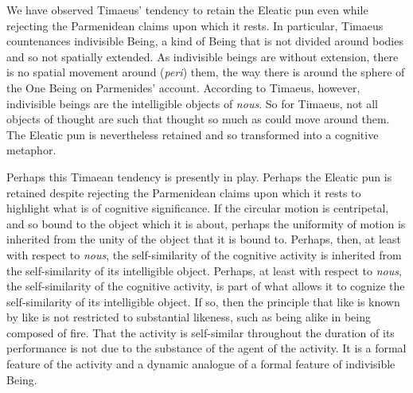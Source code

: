 We have observed Timaeus' tendency to retain the Eleatic pun even while rejecting the Parmenidean claims upon which it rests. In particular, Timaeus countenances indivisible Being, a kind of Being that is not divided around bodies and so not spatially extended. As indivisible beings are without extension, there is no spatial movement around (\emph{peri}) them, the way there is around the sphere of the One Being on Parmenides’ account. According to Timaeus, however, indivisible beings are the intelligible objects of \emph{nous}. So for Timaeus, not all objects of thought are such that thought so much as could move around them. The Eleatic pun is nevertheless retained and so transformed into a cognitive metaphor. 

Perhaps this Timaean tendency is presently in play. Perhaps the Eleatic pun is retained despite rejecting the Parmenidean claims upon which it rests to highlight what is of cognitive significance. If the circular motion is centripetal, and so bound to the object which it is about, perhaps the uniformity of motion is inherited from the unity of the object that it is bound to. Perhaps, then, at least with respect to \emph{nous}, the self-similarity of the cognitive activity is inherited from the self-similarity of its intelligible object. Perhaps, at least with respect to \emph{nous}, the self-similarity of the cognitive activity, is part of what allows it to cognize the self-similarity of its intelligible object. If so, then the principle that like is known by like is not restricted to substantial likeness, such as being alike in being composed of fire. That the activity is self-similar throughout the duration of its performance is not due to the substance of the agent of the activity. It is a formal feature of the activity and a dynamic analogue of a formal feature of indivisible Being. 

